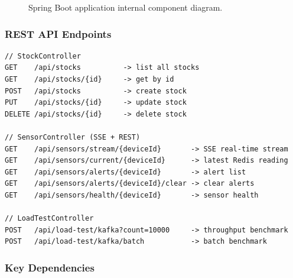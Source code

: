 \documentclass[12pt,a4paper,twoside]{article}
\begin{document}
\begin{figure}[H]
\caption{Spring Boot application internal component diagram.}
\label{fig:backend}
\end{figure}

\subsubsection{REST API Endpoints}

\begin{lstlisting}[style=javaStyle, caption={Controller endpoint overview}]
// StockController
GET    /api/stocks          -> list all stocks
GET    /api/stocks/{id}     -> get by id
POST   /api/stocks          -> create stock
PUT    /api/stocks/{id}     -> update stock
DELETE /api/stocks/{id}     -> delete stock

// SensorController (SSE + REST)
GET    /api/sensors/stream/{deviceId}       -> SSE real-time stream
GET    /api/sensors/current/{deviceId}      -> latest Redis reading
GET    /api/sensors/alerts/{deviceId}       -> alert list
GET    /api/sensors/alerts/{deviceId}/clear -> clear alerts
GET    /api/sensors/health/{deviceId}       -> sensor health

// LoadTestController
POST   /api/load-test/kafka?count=10000     -> throughput benchmark
POST   /api/load-test/kafka/batch           -> batch benchmark
\end{lstlisting}

\subsubsection{Key Dependencies}
\end{document}

